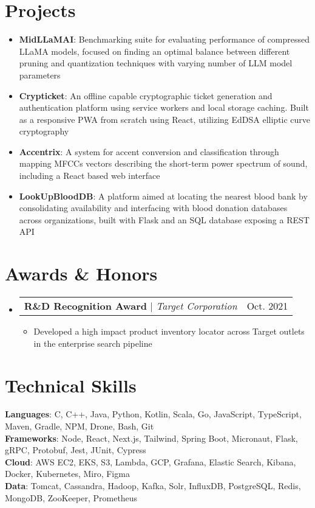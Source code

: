 \documentclass[letterpaper,11pt]{article}
\makeatletter
\newcommand{\resumeItem}[1]{
  \item\small{
    {#1 \vspace{-1pt}}
  }
}
\newcommand{\resumeProjectHeading}[2]{
    \item
    \begin{tabular*}{0.97\textwidth}{l@{\extracolsep{\fill}}r}
      \small#1 & #2 \\
    \end{tabular*}\vspace{-7pt}
}
\newcommand{\resumeSubHeadingListStart}{\begin{itemize}[leftmargin=0.15in, label={}]}
\newcommand{\resumeSubHeadingListEnd}{\end{itemize}}
\newcommand{\resumeItemListStart}{\begin{itemize}}
\newcommand{\resumeItemListEnd}{\end{itemize}\vspace{-5pt}}
\makeatother
\begin{document}
\section{Projects}
    \resumeSubHeadingListStart
        \resumeItem{\textbf{MidLLaMAI}{: Benchmarking suite for evaluating performance of compressed LLaMA models, focused on finding an optimal balance between different pruning and quantization techniques with varying number of LLM model parameters}}
        \resumeItem{\textbf{Crypticket}{: An offline capable cryptographic ticket generation and authentication platform using service workers and local storage caching. Built as a responsive PWA from scratch using React, utilizing EdDSA elliptic curve cryptography}}
        \resumeItem{\textbf{Accentrix}{: A system for accent conversion and classification through mapping MFCCs vectors describing the short-term power spectrum of sound, including a React based web interface}}
        \resumeItem{\textbf{LookUpBloodDB}{: A platform aimed at locating the nearest blood bank by consolidating availability and interfacing with blood donation databases across organizations, built with Flask and an SQL database exposing a REST API}}
    \resumeSubHeadingListEnd


\section{Awards \& Honors}
    \resumeSubHeadingListStart
      \resumeProjectHeading
          {\textbf{R\&D Recognition Award} $|$ \emph{Target Corporation}}{Oct. 2021}
          \resumeItemListStart
            \resumeItem{Developed a high impact product inventory locator across Target outlets in the enterprise search pipeline}
          \resumeItemListEnd
    \resumeSubHeadingListEnd


\section{Technical Skills}
 \begin{itemize}[leftmargin=0.15in, label={}]
    \small{\item{
     \textbf{Languages}{: C, C++, Java, Python, Kotlin, Scala, Go, JavaScript, TypeScript, Maven, Gradle, NPM, Drone, Bash, Git} \\
     \textbf{Frameworks}{: Node, React, Next.js, Tailwind, Spring Boot, Micronaut, Flask, gRPC, Protobuf, Jest, JUnit, Cypress} \\
     \textbf{Cloud}{: AWS EC2, EKS, S3, Lambda, GCP, Grafana, Elastic Search, Kibana, Docker, Kubernetes, Miro, Figma} \\
     \textbf{Data}{: Tomcat, Cassandra, Hadoop, Kafka, Solr, InfluxDB, PostgreSQL, Redis, MongoDB, ZooKeeper, Prometheus}
    }}
 \end{itemize}


\end{document}
